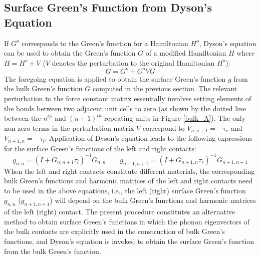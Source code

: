 \documentclass[11pt]{article}
\begin{document}
\subsection{Surface Green's Function from Dyson's Equation}
If $G^o$ corresponds to the Green's function for a Hamiltonian $H^o$, Dyson's equation \cite{mingo2009green} can be used to obtain the Green's function $G$ of a modified Hamiltonian $H$ where $H = H^o+V$ ($V$ denotes the perturbation to the original Hamiltonian $H^o$):
\begin{equation}
G = G^o+G^oVG
\end{equation}
The foregoing equation is applied to obtain the surface Green's function $g$ from the bulk Green's function $G$ computed in the previous section. The relevant perturbation to the force constant matrix essentially involves setting elements of the bonds between two adjacent unit cells to zero (as shown by the dotted line between the $n^{th}$ and $(n+1)^{th}$ repeating units in Figure \ref{bulk_A}). The only non-zero terms in the perturbation matrix $V$ correspond to $V_{n,n+1}=-\tau_r$ and $V_{n+1,n}=-\tau_l$. Application of Dyson's equation leads to the following expressions for the surface Green's functions of the left and right contacts:
\begin{equation}
g_{n,n} = (I+G_{n,n+1}\tau_l)^{-1}G_{n,n} \qquad g_{n+1,n+1} = (I+G_{n+1,n}\tau_r)^{-1}G_{n+1,n+1}
\label{dyson_g}
\end{equation}
When the left and right contacts constitute different materials, the corresponding bulk Green's functions and harmonic matrices of the left and right contacts need to be used in the above equations, i.e., the left (right) surface Green's function $g_{n,n}$ ($g_{n+1,n+1}$) will depend on the bulk Green's functions and harmonic matrices of the left (right) contact. The present procedure constitutes an alternative method to obtain surface Green's functions in which the phonon eigenvectors of the bulk contacts are explicitly used in the construction of bulk Green's functions, and Dyson's equation is invoked to obtain the surface Green's function from the bulk Green's function.
\end{document}
